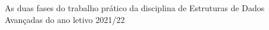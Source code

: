 As duas fases do trabalho prático da disciplina de Estruturas de Dados Avançadas do ano letivo 2021/22 